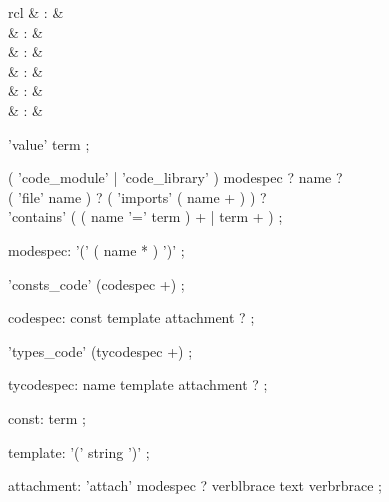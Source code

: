 \begin{isabellebody}
\begin{isamarkuptext}
  \begin{matharray}{rcl}
    \hypertarget{command.HOL.value}{\hyperlink{command.HOL.value}{\mbox{}}}\isa{{\isachardoublequote}\isactrlsup {\isacharasterisk}{\isachardoublequote}} & : &  \\
    \hypertarget{command.HOL.code-module}{\hyperlink{command.HOL.code-module}{\mbox{}}} & : &  \\
    \hypertarget{command.HOL.code-library}{\hyperlink{command.HOL.code-library}{\mbox{}}} & : &  \\
    \hypertarget{command.HOL.consts-code}{\hyperlink{command.HOL.consts-code}{\mbox{}}} & : &  \\
    \hypertarget{command.HOL.types-code}{\hyperlink{command.HOL.types-code}{\mbox{}}} & : &  \\  
    \hypertarget{attribute.HOL.code}{\hyperlink{attribute.HOL.code}{\mbox{}}} & : & \isaratt \\
  \end{matharray}

  \begin{rail}
  'value' term
  ;

  ( 'code\_module' | 'code\_library' ) modespec ? name ? \\
    ( 'file' name ) ? ( 'imports' ( name + ) ) ? \\
    'contains' ( ( name '=' term ) + | term + )
  ;

  modespec: '(' ( name * ) ')'
  ;

  'consts\_code' (codespec +)
  ;

  codespec: const template attachment ?
  ;

  'types\_code' (tycodespec +)
  ;

  tycodespec: name template attachment ?
  ;

  const: term
  ;

  template: '(' string ')'
  ;

  attachment: 'attach' modespec ? verblbrace text verbrbrace
  ;


\end{rail}
\end{isamarkuptext}
\end{isabellebody}
